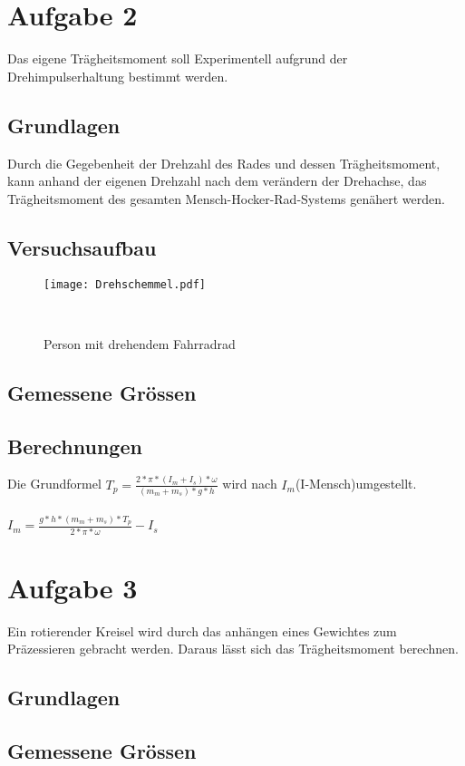 \documentclass{article}
\begin{document}
\section{Aufgabe 2}
Das eigene Trägheitsmoment soll Experimentell aufgrund der Drehimpulserhaltung bestimmt werden.

\subsection{Grundlagen}
Durch die Gegebenheit der Drehzahl des Rades und dessen Trägheitsmoment, kann anhand der eigenen
Drehzahl nach dem verändern der Drehachse, das Trägheitsmoment des gesamten 
 Mensch-Hocker-Rad-Systems genähert werden.

\subsection{Versuchsaufbau}
\begin{figure}[h]
\center

\texttt{[image: Drehschemmel.pdf]} 
\caption{Person mit drehendem Fahrradrad}
\
\end{figure}
\subsection{Gemessene Grössen}
\subsection{Berechnungen}
Die Grundformel
$T_p = \frac{2*\pi*(I_m+I_s)*\omega}{(m_m+m_s)*g*h} $ wird nach $I_m$(I-Mensch)umgestellt.\\\\
$I_m = \frac{g*h*(m_m+m_s)*T_p}{2*\pi*\omega}-I_s$




\section{Aufgabe 3}
Ein rotierender Kreisel wird durch das anhängen eines Gewichtes zum Präzessieren gebracht werden. Daraus lässt sich das Trägheitsmoment berechnen. 
\subsection{Grundlagen}
\subsection{Gemessene Grössen}
\end{document}
